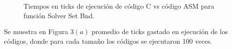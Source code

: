  \begin{figure}[htbp]
\centering


\caption{Tiempos en ticks de ejecución de código C vs código ASM para función Solver Set Bnd.} \label{fig:lego}
\end{figure}



Se muestra en Figura 3$(a)$ promedio de ticks gastado en ejecución de los códigos, donde para cada tamaño los códigos se ejecutaron 100 veces.

  

